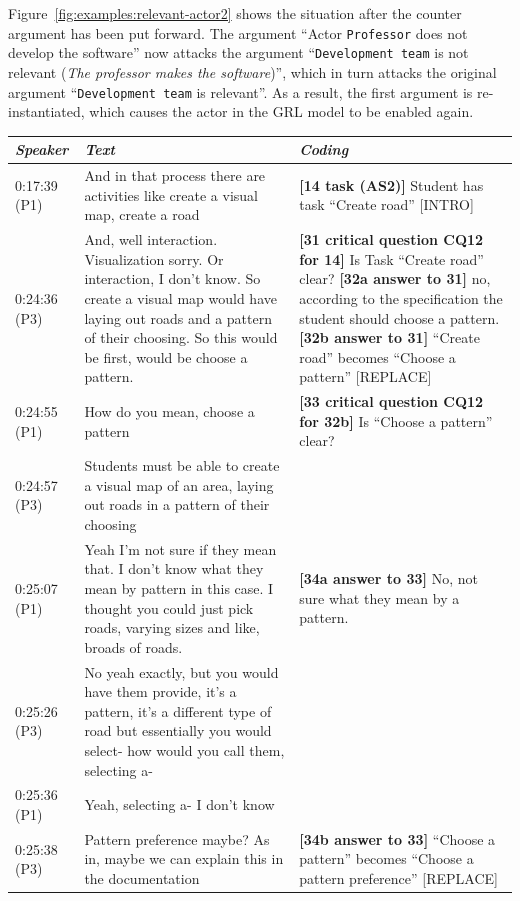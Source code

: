 Figure~\ref{fig:examples:relevant-actor2} shows the situation after the counter argument has been put forward. The argument ``Actor \texttt{Professor} does not develop the software'' now attacks the argument ``\texttt{Development team} is not relevant (\emph{The professor makes the software})'', which in turn attacks the original argument ``\texttt{Development team} is relevant''. As a result, the first argument is re-instantiated, which causes the actor in the GRL model to be enabled again.

\begin{tabular}{|p{17mm}|p{63mm}|p{70mm}|}
\hline
\textit{Speaker} & \textit{Text} & \textit{Coding}\\
\hline
0:17:39 (P1) & And in that process there are activities like create a visual map, create a road& \textbf{[14 task (AS2)]} Student has task ``Create road'' \textsf{[INTRO]}\\
\hline
0:24:36 (P3)	& And, well interaction. Visualization sorry. Or interaction, I don't know. So create a visual map would have laying out roads and a pattern of their choosing. So this would be first, would be choose a pattern. & \textbf{[31 critical question CQ12 for 14]} Is Task ``Create road'' clear?\newline
\textbf{[32a answer to 31]} no, according to the specification the student should choose a pattern. \newline
\textbf{[32b answer to 31]} ``Create road'' becomes ``Choose a pattern'' \textsf{[REPLACE]}\\
\hline
0:24:55 (P1) &	How do you mean, choose a pattern	& \textbf{[33 critical question CQ12 for 32b]} Is ``Choose a pattern'' clear? \\
\cline{1-2}
0:24:57 (P3)	& Students must be able to create a visual map of an area, laying out roads in a pattern of their choosing	&\\
\cline{1-2}
0:25:07 (P1)	& Yeah I'm not sure if they mean that. I don't know what they mean by pattern in this case. I thought you could just pick roads, varying sizes and like, broads of roads. & 
\textbf{[34a answer to 33]} No, not sure what they mean by a pattern.\\
\cline{1-2}
0:25:26 (P3) & No yeah exactly, but you would have them provide, it's a pattern, it's a different type of road but essentially you would select- how would you call them, selecting a- & \\
\cline{1-2}
0:25:36 (P1) & Yeah, selecting a- I don't know &\\
\cline{1-2}
0:25:38 (P3)	& Pattern preference maybe? As in, maybe we can explain this in the documentation & \textbf{[34b answer to 33]} ``Choose a pattern'' becomes ``Choose a pattern preference'' \textsf{[REPLACE]}\\

\end{tabular}
